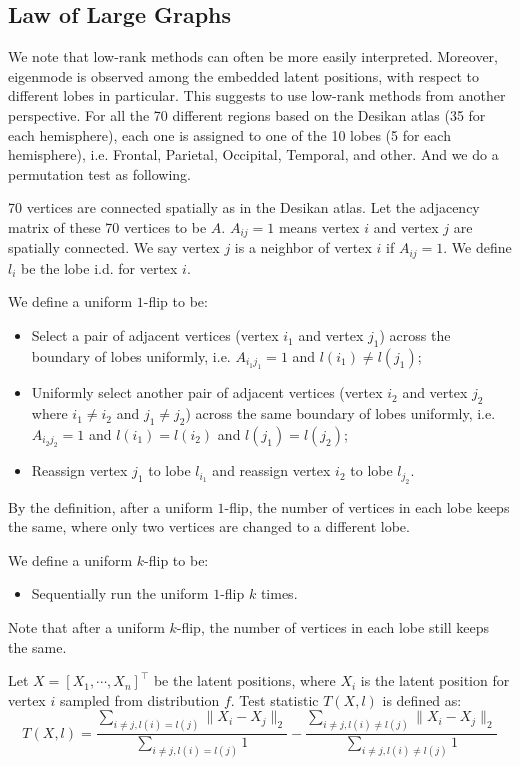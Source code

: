 \documentclass[simplex.tex]{subfiles}
\begin{document}
\subsection{Law of Large Graphs}
We note that low-rank methods can often be more easily interpreted. Moreover, eigenmode is observed among the embedded latent positions, with respect to different lobes in particular. This suggests to use low-rank methods from another perspective. 
For all the 70 different regions based on the Desikan atlas (35 for each hemisphere), each one is assigned to one of the 10 lobes (5 for each hemisphere), i.e. Frontal, Parietal, Occipital, Temporal, and other. And we do a permutation test as following.

70 vertices are connected spatially as in the Desikan atlas. Let the adjacency matrix of these 70 vertices to be $A$. $A_{ij} = 1$ means vertex $i$ and vertex $j$ are spatially connected. We say vertex $j$ is a neighbor of vertex $i$ if $A_{ij} = 1$. We define $l_i$ be the lobe i.d. for vertex $i$.

We define a uniform $1$-flip to be:
\begin{itemize}
\item Select a pair of adjacent vertices (vertex $i_1$ and vertex $j_1$) across the boundary of lobes uniformly, i.e. $A_{i_1 j_1} = 1$ and $l(i_1) \ne l(j_1)$;
\item Uniformly select another pair of adjacent vertices (vertex $i_2$ and vertex $j_2$ where $i_1 \ne i_2$ and $j_1 \ne j_2$) across the same boundary of lobes uniformly, i.e. $A_{i_2 j_2} = 1$ and $l(i_1) = l(i_2)$ and $l(j_1) = l(j_2)$;
\item Reassign vertex $j_1$ to lobe $l_{i_1}$ and reassign vertex $i_2$ to lobe $l_{j_2}$.
\end{itemize}

By the definition, after a uniform $1$-flip, the number of vertices in each lobe keeps the same, where only two vertices are changed to a different lobe.

We define a uniform $k$-flip to be:
\begin{itemize}
\item Sequentially run the uniform $1$-flip $k$ times.
\end{itemize}

Note that after a uniform $k$-flip, the number of vertices in each lobe still keeps the same.

Let $X = [X_1, \cdots, X_n]^{\top}$ be the latent positions, where $X_i$ is the latent position for vertex $i$ sampled from distribution $f$. Test statistic $T(X, l)$ is defined as:
\[
T(X, l) = \frac{\sum_{i \ne j, l(i) = l(j)} \|X_i - X_j \|_2}{\sum_{i \ne j, l(i) = l(j)} 1} -
\frac{\sum_{i \ne j, l(i) \ne l(j)} \|X_i - X_j \|_2}{\sum_{i \ne j, l(i) \ne l(j)} 1}
\]
\end{document}

